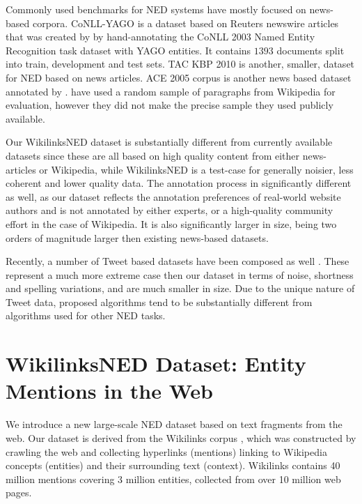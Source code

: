 \documentclass[11pt]{article}
\begin{document}
	Commonly used benchmarks for NED systems have mostly focused on news-based corpora. CoNLL-YAGO is a dataset based on Reuters newswire articles that was created by  by hand-annotating the CoNLL 2003 Named Entity Recognition task dataset with YAGO entities. It contains $1393$ documents split into train, development and test sets. TAC KBP 2010 \cite{ji2010overview} is another, smaller, dataset for NED based on news articles. ACE 2005 corpus is another news based dataset annotated by .  have used a random sample of paragraphs from Wikipedia for evaluation, however they did not make the precise sample they used publicly available. 
	
	Our WikilinksNED dataset is substantially different from currently available datasets since these are all based on high quality content from either news-articles or Wikipedia, while WikilinksNED is a test-case for generally noisier, less coherent and lower quality data. The annotation process in significantly different as well, as our dataset reflects the annotation preferences of real-world website authors and is not annotated by either experts, or a high-quality community effort in the case of Wikipedia. It is also significantly larger in size, being two orders of magnitude larger then existing news-based datasets.
	
	Recently, a number of Tweet based datasets have been composed as well \cite{fromreide2014crowdsourcing}. These represent a much more extreme case then our dataset in terms of noise, shortness and spelling variations, and are much smaller in size. Due to the unique nature of Tweet data, proposed algorithms tend to be substantially different from algorithms used for other NED tasks.
	
	\section{WikilinksNED Dataset: Entity Mentions in the Web}
	\label{sec:w}
	
	We introduce a new large-scale NED dataset based on text fragments from the web. Our dataset is derived from the Wikilinks corpus \cite{singh12:wiki-links}, which was constructed by crawling the web and collecting hyperlinks (mentions) linking to Wikipedia concepts (entities) and their surrounding text (context). Wikilinks contains 40 million mentions covering 3 million entities, collected from over 10 million web pages. 
	
\end{document}

